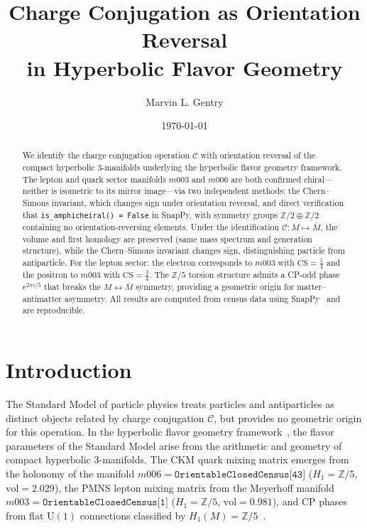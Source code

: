 \documentclass[12pt]{article}
\title{Charge Conjugation as Orientation Reversal\\
in Hyperbolic Flavor Geometry}
\author[1]{Marvin L. Gentry}
\affil[1]{Independent Researcher, \texttt{drmlgentry@protonmail.com} \\ ORCID: 0009-0006-4550-2663}
\date{\today}
\theoremstyle{definition}
\begin{document}
\maketitle

\begin{abstract}
We identify the charge conjugation operation $\mathcal{C}$ with
orientation reversal of the compact hyperbolic 3-manifolds underlying
the hyperbolic flavor geometry framework. The lepton and quark sector
manifolds $m003$ and $m006$ are both confirmed chiral---neither is
isometric to its mirror image---via two independent methods: the
Chern--Simons invariant, which changes sign under orientation reversal,
and direct verification that \texttt{is\_amphicheiral() = False} in
SnapPy, with symmetry groups $\mathbb{Z}/2\oplus\mathbb{Z}/2$
containing no orientation-reversing elements. Under the identification
$\mathcal{C}: M\mapsto\bar{M}$, the volume and first homology are
preserved (same mass spectrum and generation structure), while the
Chern--Simons invariant changes sign, distinguishing particle from
antiparticle. For the lepton sector: the electron corresponds to
$m003$ with $\mathrm{CS}=\tfrac{1}{4}$ and the positron to
$\overline{m003}$ with $\mathrm{CS}=\tfrac{3}{4}$. The $\mathbb{Z}/5$
torsion structure admits a CP-odd phase $e^{2\pi i/5}$ that breaks the
$M\leftrightarrow\bar{M}$ symmetry, providing a geometric origin for
matter--antimatter asymmetry. All results are computed from census data
using SnapPy~\cite{SnapPy} and are reproducible.
\end{abstract}

\section{Introduction}
\label{sec:intro}

The Standard Model of particle physics treats particles and antiparticles
as distinct objects related by charge conjugation $\mathcal{C}$, but
provides no geometric origin for this operation. In the hyperbolic flavor
geometry framework~\cite{Gentry:CKM,Gentry:PMNS,Gentry:CP}, the flavor
parameters of the Standard Model arise from the arithmetic and geometry
of compact hyperbolic 3-manifolds. The CKM quark mixing matrix emerges
from the holonomy of the manifold $m006 = \texttt{OrientableClosedCensus[43]}$
($H_1 = \mathbb{Z}/5$, $\mathrm{vol} = 2.029$), the PMNS lepton mixing
matrix from the Meyerhoff manifold $m003 = \texttt{OrientableClosedCensus[1]}$
($H_1 = \mathbb{Z}/5$, $\mathrm{vol} = 0.981$), and CP phases from flat
$\mathrm{U}(1)$ connections classified by $H_1(M) = \mathbb{Z}/5$~\cite{Gentry:CP}.
\end{document}
